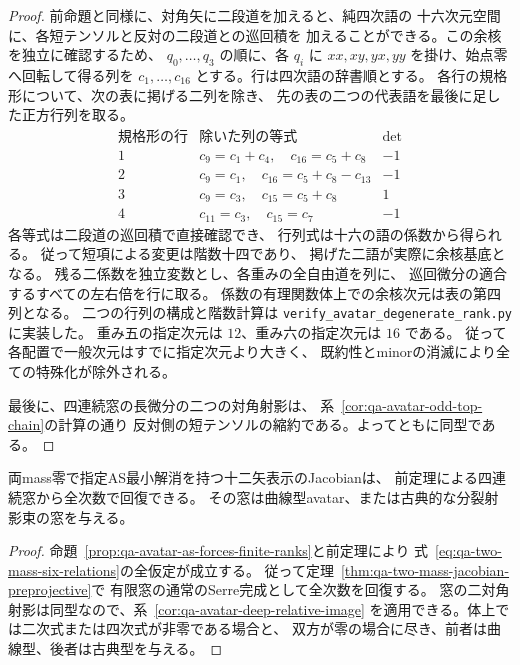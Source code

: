 \begin{proof}
前命題と同様に、対角矢に二段道を加えると、純四次語の
十六次元空間に、各短テンソルと反対の二段道との巡回積を
加えることができる。この余核を独立に確認するため、
$q_0,\ldots,q_3$ の順に、各 $q_i$ に
$xx,xy,yx,yy$ を掛け、始点零へ回転して得る列を
$c_1,\ldots,c_{16}$ とする。行は四次語の辞書順とする。
各行の規格形について、次の表に掲げる二列を除き、
先の表の二つの代表語を最後に足した正方行列を取る。
\[
\begin{array}{c|c|r}
\text{規格形の行}&\text{除いた列の等式}&\det\\\hline
1&c_9=c_1+c_4,\quad c_{16}=c_5+c_8&-1\\
2&c_9=c_1,\quad c_{16}=c_5+c_8-c_{13}&-1\\
3&c_9=c_3,\quad c_{15}=c_5+c_8&1\\
4&c_{11}=c_3,\quad c_{15}=c_7&-1
\end{array}
\]
各等式は二段道の巡回積で直接確認でき、
行列式は十六の語の係数から得られる。
従って短項による変更は階数十四であり、
掲げた二語が実際に余核基底となる。
残る二係数を独立変数とし、各重みの全自由道を列に、
巡回微分の適合するすべての左右倍を行に取る。
係数の有理関数体上での余核次元は表の第四列となる。
二つの行列の構成と階数計算は
\texttt{verify\_avatar\_degenerate\_rank.py} に実装した。
重み五の指定次元は $12$、重み六の指定次元は $16$ である。
従って各配置で一般次元はすでに指定次元より大きく、
既約性とminorの消滅により全ての特殊化が除外される。

最後に、四連続窓の長微分の二つの対角射影は、
系~\ref{cor:qa-avatar-odd-top-chain}の計算の通り
反対側の短テンソルの縮約である。よってともに同型である。
\end{proof}

\begin{corollary}[体上の両mass零avatarの復元]
両mass零で指定AS最小解消を持つ十二矢表示のJacobianは、
前定理による四連続窓から全次数で回復できる。
その窓は曲線型avatar、または古典的な分裂射影束の窓を与える。
\end{corollary}
\begin{proof}
命題~\ref{prop:qa-avatar-as-forces-finite-ranks}と前定理により
式~\eqref{eq:qa-two-mass-six-relations}の全仮定が成立する。
従って定理~\ref{thm:qa-two-mass-jacobian-preprojective}で
有限窓の通常のSerre完成として全次数を回復する。
窓の二対角射影は同型なので、系~\ref{cor:qa-avatar-deep-relative-image}
を適用できる。体上では二次式または四次式が非零である場合と、
双方が零の場合に尽き、前者は曲線型、後者は古典型を与える。
\end{proof}

